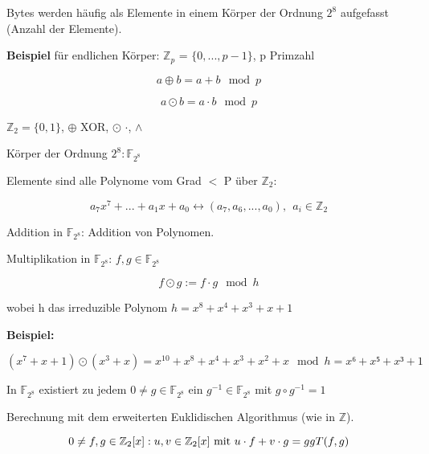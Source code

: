 \par \medskip

Bytes werden häufig als Elemente in einem Körper der Ordnung $2^8$ aufgefasst (Anzahl der Elemente).

\par \medskip

\textbf{Beispiel} für endlichen Körper: $\mathbb{Z}_p$ = $\{0,...,p-1\}$, p Primzahl

\begin{equation}
  a \oplus b = a+b \mod p
\end{equation}

\begin{equation}
  a \odot b = a \cdot b \mod p
\end{equation} 

$\mathbb{Z}_2 = \{0,1\}$, $\oplus$ XOR, $\odot$ $\cdot$, $\wedge$

Körper der Ordnung $2^8: \mathbb{F}_{2^8}$

Elemente sind alle Polynome vom Grad $<$ P über $\mathbb{Z}_2$:

\begin{equation}
  a_7x^7+...+a_1x+a_0 \leftrightarrow (a_7, a_6, ..., a_0), \ \ a_i \in \mathbb{Z}_2
\end{equation}

Addition in $\mathbb{F}_{2^8}$: Addition von Polynomen.

Multiplikation in $\mathbb{F}_{2^8}$: $f,g \in \mathbb{F}_{2^8}$

\begin{equation}
  f \odot g := f \cdot g \mod h
\end{equation}

wobei h das irreduzible Polynom $h = x^8 + x^4 + x^3 + x + 1$

\par \medskip

\textbf{Beispiel:} 

$(x^7 + x + 1) \odot (x^3 + x) = x^{10} + x^8 + x^4 + x^3 + x^2 + x \mod h = x⁶ + x⁵ +x³ + 1$

In $\mathbb{F}_{2^8}$ existiert zu jedem $0 \neq g \in \mathbb{F}_{2^8}$ ein $g^{-1} \in \mathbb{F}_{2^8}$ mit $g \circ g^{-1} = 1$

Berechnung mit dem erweiterten Euklidischen Algorithmus (wie in $\mathbb{Z}$).

\begin{equation}
  0 \neq f, g \in \mathbb{Z}_2[x]: u,v \in \mathbb{Z}_{2}[x] \textnormal{ mit } u \cdot f + v \cdot g = ggT(f,g)
\end{equation}

